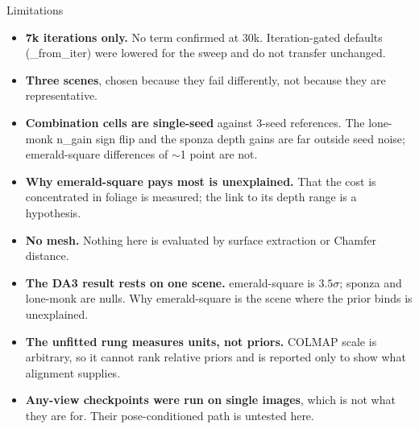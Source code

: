 \documentclass[aspectratio=169,9pt]{beamer}
\makeatletter
\newcommand{\code}[1]{{\ttfamily\fontsize{0.92\f@size}{\f@baselineskip}\selectfont #1}}
\makeatother
\begin{document}
\begin{frame}{Limitations}
  \begin{itemize}
    \item \textbf{7k iterations only.} No term confirmed at 30k. Iteration-gated defaults
          (\code{*\_from\_iter}) were lowered for the sweep and do not transfer unchanged.
    \item \textbf{Three scenes}, chosen because they fail differently, not because they are
          representative.
    \item \textbf{Combination cells are single-seed} against 3-seed references. The
          \code{lone-monk} \code{n\_gain} sign flip and the \code{sponza} depth gains are far
          outside seed noise; \code{emerald-square} differences of $\sim$1 point are not.
    \item \textbf{Why \code{emerald-square} pays most is unexplained.} That the cost is
          concentrated in foliage is measured; the link to its depth range is a hypothesis.
    \item \textbf{No mesh.} Nothing here is evaluated by surface extraction or Chamfer distance.
    \item \textbf{The DA3 result rests on one scene.} \code{emerald-square} is $3.5\sigma$;
          \code{sponza} and \code{lone-monk} are nulls. Why \code{emerald-square} is the scene
          where the prior binds is unexplained.
    \item \textbf{The unfitted rung measures units, not priors.} COLMAP scale is arbitrary, so
          it cannot rank relative priors and is reported only to show what alignment supplies.
    \item \textbf{Any-view checkpoints were run on single images}, which is not what they are
          for. Their pose-conditioned path is untested here.
  \end{itemize}
\end{frame}
\end{document}
